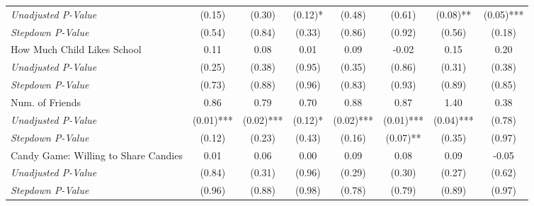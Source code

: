 \begin{tabular}{l c c c c c c c}
\quad \textit{Unadjusted P-Value} & (0.15) & (0.30) & (0.12)* & (0.48) & (0.61) & (0.08)** & (0.05)*** \\
\quad \textit{Stepdown P-Value} & (0.54) & (0.84) & (0.33) & (0.86) & (0.92) & (0.56) & (0.18) \\
How Much Child Likes School & 0.11 & 0.08 & 0.01 & 0.09 & -0.02 & 0.15 & 0.20 \\
\quad \textit{Unadjusted P-Value} & (0.25) & (0.38) & (0.95) & (0.35) & (0.86) & (0.31) & (0.38) \\
\quad \textit{Stepdown P-Value} & (0.73) & (0.88) & (0.96) & (0.83) & (0.93) & (0.89) & (0.85) \\
Num. of Friends & 0.86 & 0.79 & 0.70 & 0.88 & 0.87 & 1.40 & 0.38 \\
\quad \textit{Unadjusted P-Value} & (0.01)*** & (0.02)*** & (0.12)* & (0.02)*** & (0.01)*** & (0.04)*** & (0.78) \\
\quad \textit{Stepdown P-Value} & (0.12) & (0.23) & (0.43) & (0.16) & (0.07)** & (0.35) & (0.97) \\
Candy Game: Willing to Share Candies & 0.01 & 0.06 & 0.00 & 0.09 & 0.08 & 0.09 & -0.05 \\
\quad \textit{Unadjusted P-Value} & (0.84) & (0.31) & (0.96) & (0.29) & (0.30) & (0.27) & (0.62) \\
\quad \textit{Stepdown P-Value} & (0.96) & (0.88) & (0.98) & (0.78) & (0.79) & (0.89) & (0.97) \\
\bottomrule
\end{tabular}

